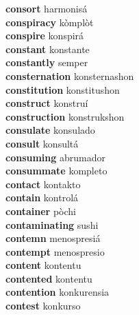 \textbf{consort } harmonisá \\
\textbf{conspiracy } kòmplòt \\
\textbf{conspire } konspirá \\
\textbf{constant } konstante \\
\textbf{constantly } semper \\
\textbf{consternation } konsternashon \\
\textbf{constitution } konstitushon \\
\textbf{construct } konstruí \\
\textbf{construction } konstrukshon \\
\textbf{consulate } konsulado \\
\textbf{consult } konsultá \\
\textbf{consuming } abrumador \\
\textbf{consummate } kompleto \\
\textbf{contact } kontakto \\
\textbf{contain } kontrolá \\
\textbf{container } pòchi \\
\textbf{contaminating } sushi \\
\textbf{contemn } menospresiá \\
\textbf{contempt } menospresio \\
\textbf{content } kontentu \\
\textbf{contented } kontentu \\
\textbf{contention } konkurensia \\
\textbf{contest } konkurso \\
